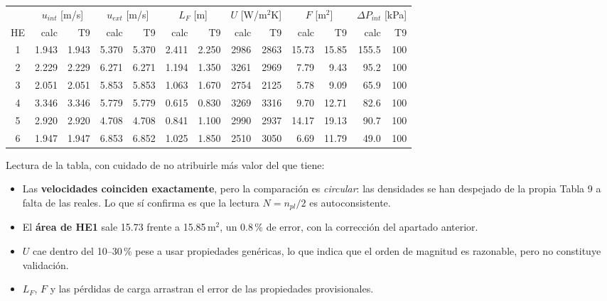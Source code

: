 \documentclass[11pt,a4paper]{article}
\begin{document}
\begin{table}[h]
\centering
\small
\begin{tabular}{crrrrrrrrrrrr}
\toprule
& \multicolumn{2}{c}{$u_{int}$ [m/s]} & \multicolumn{2}{c}{$u_{ext}$ [m/s]} & \multicolumn{2}{c}{$L_F$ [m]} & \multicolumn{2}{c}{$U$ [W/m$^2$K]} & \multicolumn{2}{c}{$F$ [m$^2$]} & \multicolumn{2}{c}{$\Delta P_{int}$ [kPa]}\\
\cmidrule(lr){2-3}\cmidrule(lr){4-5}\cmidrule(lr){6-7}\cmidrule(lr){8-9}\cmidrule(lr){10-11}\cmidrule(lr){12-13}
HE & calc & T9 & calc & T9 & calc & T9 & calc & T9 & calc & T9 & calc & T9\\
\midrule
1 & 1.943 & 1.943 & 5.370 & 5.370 & 2.411 & 2.250 & 2986 & 2863 & 15.73 & 15.85 & 155.5 & 100\\
2 & 2.229 & 2.229 & 6.271 & 6.271 & 1.194 & 1.350 & 3261 & 2969 &  7.79 &  9.43 &  95.2 & 100\\
3 & 2.051 & 2.051 & 5.853 & 5.853 & 1.063 & 1.670 & 2754 & 2125 &  5.78 &  9.09 &  65.9 & 100\\
4 & 3.346 & 3.346 & 5.779 & 5.779 & 0.615 & 0.830 & 3269 & 3316 &  9.70 & 12.71 &  82.6 & 100\\
5 & 2.920 & 2.920 & 4.708 & 4.708 & 0.841 & 1.100 & 2990 & 2937 & 14.17 & 19.13 &  90.7 & 100\\
6 & 1.947 & 1.947 & 6.853 & 6.852 & 1.025 & 1.850 & 2510 & 3050 &  6.69 & 11.79 &  49.0 & 100\\
\bottomrule
\end{tabular}
\end{table}

Lectura de la tabla, con cuidado de no atribuirle más valor del que tiene:

\begin{itemize}
  \item Las \textbf{velocidades coinciden exactamente}, pero la comparación es
        \emph{circular}: las densidades se han despejado de la propia Tabla 9 a falta de las
        reales. Lo que sí confirma es que la lectura $N = n_{pl}/2$ es autoconsistente.
  \item El \textbf{área de HE1} sale 15.73 frente a 15.85\,m$^2$, un 0.8\,\% de error, con la
        corrección del apartado anterior.
  \item $U$ cae dentro del 10--30\,\% pese a usar propiedades genéricas, lo que indica que el
        orden de magnitud es razonable, pero no constituye validación.
  \item $L_F$, $F$ y las pérdidas de carga arrastran el error de las propiedades provisionales.
\end{itemize}
\end{document}
